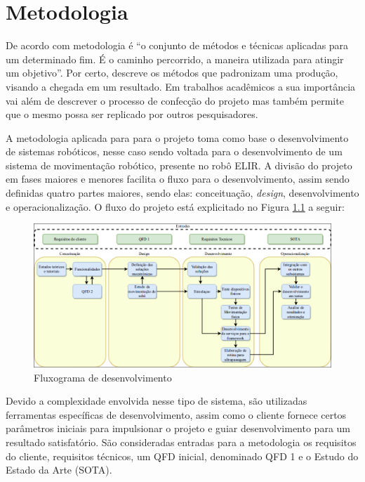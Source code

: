 \chapter{Metodologia}
\label{chap:meto}
De acordo com \cite{maia} metodologia é “o conjunto de métodos e técnicas aplicadas para um determinado fim. É o caminho percorrido, a maneira utilizada para atingir um objetivo”. Por certo, descreve os métodos que padronizam uma produção, visando a chegada em um resultado. Em trabalhos acadêmicos a sua importância vai além de descrever o processo de confecção do projeto mas também permite que o mesmo possa ser replicado por outros pesquisadores.

A metodologia aplicada para para o projeto toma como base o desenvolvimento de sistemas robóticos, nesse caso sendo voltada para o desenvolvimento de um sistema de movimentação robótico, presente no robô ELIR. A divisão do projeto em fases maiores e menores facilita o fluxo para o desenvolvimento, assim sendo definidas quatro partes maiores, sendo elas: conceituação, \textit{design}, desenvolvimento e operacionalização. O fluxo do projeto está explicitado no Figura \ref{fig:flux_desen} a seguir: 


\begin{figure}[!htb]
	\centering
	\includegraphics[scale=0.45]{Figures/flux_desen.png}
	\caption{Fluxograma de desenvolvimento}
	\label{fig:flux_desen}
\end{figure}	

Devido a complexidade envolvida nesse tipo de sistema, são utilizadas ferramentas específicas de desenvolvimento, assim como o cliente fornece certos parâmetros iniciais para impulsionar o projeto e guiar desenvolvimento para um resultado satisfatório. São consideradas entradas para a metodologia os requisitos do cliente, requisitos técnicos, um QFD inicial, denominado QFD 1 e o Estudo do Estado da Arte (SOTA).


